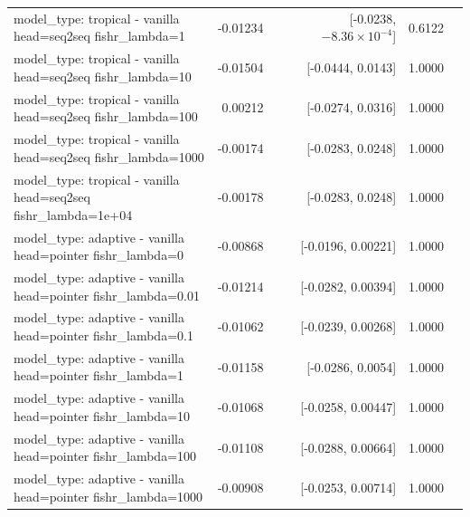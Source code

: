 \documentclass[10pt]{article}
\makeatletter
\newcommand{\stackcell}[1]{\begin{tabular}[t]{@{}l@{}}#1\end{tabular}}
\makeatother
\begin{document}
{\begin{longtable}{lrrrl}
\stackcell{model\_type: tropical - vanilla\\\footnotesize head=seq2seq fishr\_lambda=1 } & -0.01234 & [-0.0238, $-8.36\times10^{-4}$] & 0.6122 & \\
\stackcell{model\_type: tropical - vanilla\\\footnotesize head=seq2seq fishr\_lambda=10 } & -0.01504 & [-0.0444, 0.0143] & 1.0000 & \\
\stackcell{model\_type: tropical - vanilla\\\footnotesize head=seq2seq fishr\_lambda=100 } & 0.00212 & [-0.0274, 0.0316] & 1.0000 & \\
\stackcell{model\_type: tropical - vanilla\\\footnotesize head=seq2seq fishr\_lambda=1000 } & -0.00174 & [-0.0283, 0.0248] & 1.0000 & \\
\stackcell{model\_type: tropical - vanilla\\\footnotesize head=seq2seq fishr\_lambda=1e+04 } & -0.00178 & [-0.0283, 0.0248] & 1.0000 & \\
\stackcell{model\_type: adaptive - vanilla\\\footnotesize head=pointer fishr\_lambda=0 } & -0.00868 & [-0.0196, 0.00221] & 1.0000 & \\
\stackcell{model\_type: adaptive - vanilla\\\footnotesize head=pointer fishr\_lambda=0.01 } & -0.01214 & [-0.0282, 0.00394] & 1.0000 & \\
\stackcell{model\_type: adaptive - vanilla\\\footnotesize head=pointer fishr\_lambda=0.1 } & -0.01062 & [-0.0239, 0.00268] & 1.0000 & \\
\stackcell{model\_type: adaptive - vanilla\\\footnotesize head=pointer fishr\_lambda=1 } & -0.01158 & [-0.0286, 0.0054] & 1.0000 & \\
\stackcell{model\_type: adaptive - vanilla\\\footnotesize head=pointer fishr\_lambda=10 } & -0.01068 & [-0.0258, 0.00447] & 1.0000 & \\
\stackcell{model\_type: adaptive - vanilla\\\footnotesize head=pointer fishr\_lambda=100 } & -0.01108 & [-0.0288, 0.00664] & 1.0000 & \\
\stackcell{model\_type: adaptive - vanilla\\\footnotesize head=pointer fishr\_lambda=1000 } & -0.00908 & [-0.0253, 0.00714] & 1.0000 & \\

\end{longtable}}
\end{document}
